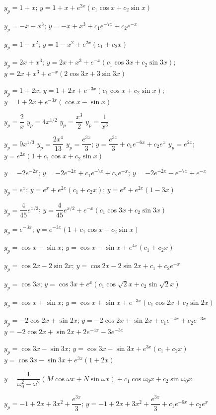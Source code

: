  $y_p=1+x$;   $y=1+x+e^{2x}(c_1\cos x+c_2\sin x)$

 $y_p=-x+x^3$;    $y=-x+x^3+c_1e^{-7x}+c_2e^{-x}$

 $y_p=1-x^2$;    $y=1-x^2+e^{2x}(c_1+c_2x)$

 $y_p=2x+x^3$;   $y=2x+x^3+e^{-x}(c_1\cos3x+c_2\sin3x)$;
$y=2x+x^3+e^{-x}(2\cos3x+3\sin3x)$

 $y_p=1+2x$;   $y=1+2x+e^{-3x}(c_1\cos x+c_2\sin x)$;
$y=1+2x+e^{-3x}(\cos x-\sin x)$

 $y_p=\dfrac{2}{x}$
 $y_p=4x^{1/2}$
 $y_p=\dfrac{x^3}{2}$
 $y_p=\dfrac{1}{x^3}$

 $y_p=9x^{1/3}$
 $y_p=\dfrac{2x^4}{13}$
 $y_p=\dfrac{e^{3x}}{3}$;
$y=\dfrac{e^{3x}}{3}+c_1e^{-6x}+c_2e^{x}$
 $y_p=e^{2x}$;    $y=e^{2x}(1+c_1\cos x+c_2\sin x)$

 $y=-2e^{-2x}$;
$y=-2e^{-2x}+c_1e^{-7x}+c_2e^{-x}$;
$y=-2e^{-2x}-e^{-7x}+e^{-x}$


 $y_p=e^{x}$;   $y=e^{x}+e^{2x}(c_1+c_2x)$;
$y=e^x+e^{2x}(1-3x)$

  $y_p=\dfrac{4}{45}e^{x/2}$;
$y=\dfrac{4}{45}e^{x/2}+e^{-x}(c_1\cos3x+c_2\sin3x)$

  $y_p=e^{-3x}$;
$y=e^{-3x}(1+c_1\cos x+c_2\sin x)$

 $y_p=\cos x-\sin x$;
$y=\cos x-\sin x+e^{4x}(c_1+c_2x)$

  $y_p=\cos2x-2\sin2x$;
 $y=\cos2x-2\sin2x+c_1+c_2e^{-x}$

 $y_p=\cos3x$;
$y=\cos3x+e^x(c_1\cos \sqrt{2}x+c_2\sin \sqrt{2} x)$

  $y_p=\cos x+\sin x$;
 $y=\cos x+\sin x+e^{-3x}(c_1\cos 2x+c_2\sin 2x)$

 $y_p=-2\cos2x+\sin2x$;
 $y=-2\cos2x+\sin2x+c_1e^{-4x}+c_2e^{-3x}$
$y=-2\cos2x+\sin2x+2e^{-4x}-3e^{-3x}$

 $y_p=\cos3x-\sin3x$;
 $y=\cos3x-\sin3x+e^{3x}(c_1+c_2x)$
$y=\cos3x-\sin3x+e^{3x}(1+2x)$

$y=\dfrac{1}{\omega_0^2-\omega^2}(M\cos\omega x+N\sin\omega
x)+c_1\cos\omega_0x+c_2\sin\omega_0x$

 $y_p=-1+2x+3x^2+\dfrac{e^{3x}}{3}$;
 $y=-1+2x+3x^2+\dfrac{e^{3x}}{3}+c_1e^{-6x}+c_2e^{x}$

